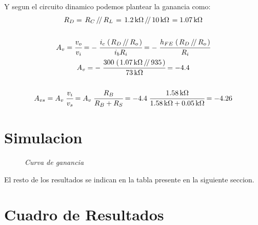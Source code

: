 \documentclass[a4paper,12pt]{article}
\newcommand{\parallelTwo}[2]{\left.#1\,\middle/\!\middle/\,#2\right.}
\newcommand{\mR}[1]{\SI{#1}{\kilo\ohm}}
\begin{document}
    Y segun el circuito dinamico podemos plantear la ganancia como:
    \begin{gather*}
        R_D = \parallelTwo{R_C}{R_L} = \parallelTwo{\mR{1.2}}{\mR{10}} = \mR{1.07}
        \\ \\
        A_v = \cfrac{v_o}{v_i} = -\; \cfrac{ i_c \; (\parallelTwo{R_D}{R_o}) } { i_b R_i } 
            = -\; \cfrac{ h_{FE} \; (\parallelTwo{R_D}{R_o}) } { R_i } \\
        A_v = -\; \cfrac{ 300 \; (\parallelTwo{\mR{1.07}}{935}) } { \mR{73} } = -4.4
        \\ \\
        A_{vs} = A_v \; \cfrac{v_i}{v_s} = A_v \; \cfrac{R_B}{R_B + R_S} = -4.4 \; \cfrac{\mR{1.58}}{\mR{1.58} + \mR{0.05}} = -4.26
    \end{gather*}


\newpage
\section{Simulacion}
    \begin{figure}[H]
        \setlength{\abovecaptionskip}{0pt}
		\centering
		\captionsetup{labelformat=empty}
		\caption{\small{\textit{ Curva de ganancia }}}
    \end{figure}

    El resto de los resultados se indican en la tabla presente en la siguiente seccion.


\newpage
\section{Cuadro de Resultados}
\end{document}
